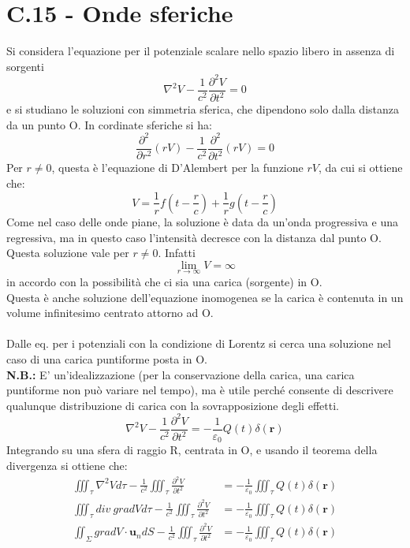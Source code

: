 \documentclass{article}
\begin{document}
\section*{C.15 - Onde sferiche}
Si considera l’equazione per il potenziale scalare nello spazio libero in assenza di sorgenti
\begin{equation}
\nabla^2V-\frac{1}{c^2}\frac{\partial^2V}{\partial t^2}=0
\nonumber
\end{equation}
e si studiano le soluzioni con simmetria sferica, che dipendono solo dalla distanza da un punto O. In cordinate sferiche si ha:
\begin{equation}
\frac{\partial^2}{\partial r^2} (rV) -\frac{1}{c^2} \frac{\partial^2}{\partial t^2}(rV)=0
\nonumber
\end{equation}
Per $r\neq0$, questa è l’equazione di D’Alembert per la funzione $rV$, da cui si ottiene che:
\begin{equation}
V=\frac{1}{r}f\left(t-\frac{r}{c}\right)+\frac{1}{r}g\left(t-\frac{r}{c}\right)
\nonumber
\end{equation}
Come nel caso delle onde piane, la soluzione è data da un’onda progressiva e una regressiva, ma in questo caso l’intensità decresce con la distanza dal punto O.\\
Questa soluzione vale per $r\neq0$. Infatti
\begin{equation}
\lim_{r\to\infty} V = \infty
\nonumber
\end{equation}
in accordo con la possibilità che ci sia una carica
(sorgente) in O.\\
Questa è anche soluzione dell’equazione inomogenea se la carica è contenuta in un volume infinitesimo centrato attorno ad O.\\
\\
Dalle eq. per i potenziali con la condizione di Lorentz si cerca una soluzione nel caso di una carica puntiforme posta in O.\\
\textbf{N.B.:} E’ un’idealizzazione (per la conservazione della carica, una carica puntiforme non può variare nel tempo), ma è utile perché consente di descrivere qualunque distribuzione di carica con la sovrapposizione degli effetti.
\begin{equation}
\nabla ^2 V-\frac{1}{c^2}\frac{\partial ^2 V}{\partial  t^2}=-\frac{1}{\varepsilon_0}Q(t)\delta (\textbf{r})
\nonumber
\end{equation}
Integrando su una sfera di raggio R, centrata in O, e usando il teorema della divergenza si ottiene che:
\begin{equation}
\begin{split}
    \iiint_{\tau}\nabla^2Vd\tau-\frac{1}{c^2}\iiint_{\tau}\frac{\partial^2V}{\partial t^2} &= -\frac{1}{\varepsilon_0}\iiint_{\tau}Q(t)\delta (\textbf{r}) \\
    \iiint_{\tau}div\ gradVd\tau-\frac{1}{c^2}\iiint_{\tau}\frac{\partial^2V}{\partial t^2} &= -\frac{1}{\varepsilon_0}\iiint_{\tau}Q(t)\delta (\textbf{r}) \\
    \iint_{\Sigma} gradV \cdot \textbf{u}_ndS- \frac{1}{c^2} \iiint_{\tau} \frac{\partial^2V}{\partial t^2} &= -\frac{1}{\varepsilon_0}\iiint_{\tau}Q(t)\delta (\textbf{r})
    \nonumber
\end{split}
\end{equation}
\end{document}
